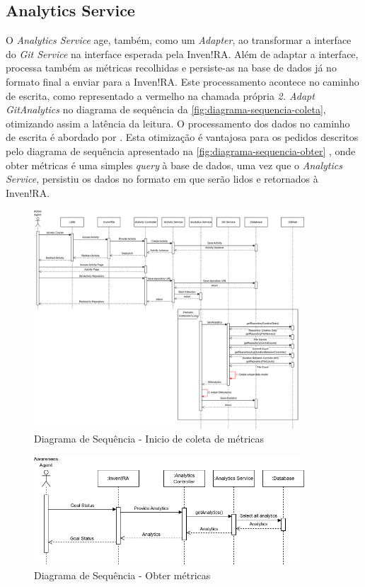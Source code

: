 \documentclass[12pt,a4paper,final]{article}
\begin{document}
    \subsection{Analytics Service}\label{subsec:analytic-sservice}
    O \textit{Analytics Service} age, também, como um \textit{Adapter}, ao transformar a interface do \textit{Git Service} na interface esperada pela Inven!RA.
    Além de adaptar a interface, processa também as métricas recolhidas e persiste-as na base de dados já no formato final a enviar para a Inven!RA. Este processamento acontece no caminho de escrita, como representado a vermelho na chamada própria \textit{2. Adapt GitAnalytics} no diagrama de sequência da \autoref{fig:diagrama-sequencia-coleta}, otimizando assim a latência da leitura.
    O processamento dos dados no caminho de escrita é abordado por \cite[Chapter 12, Observing Derived State]{kleppmann_2017_designing}.
    Esta otimização é vantajosa para os pedidos descritos pelo diagrama de sequência apresentado na \autoref{fig:diagrama-sequencia-obter} , onde obter métricas é uma simples \textit{query} à base de dados, uma vez que o \textit{Analytics Service}, persistiu os dados no formato em que serão lidos e retornados à Inven!RA.
    \begin{figure}[H]
        \centering
        \includegraphics[width=0.9\textwidth]{diagramas_sequencia-uc1.drawio}
        \caption{Diagrama de Sequência - Inicio de coleta de métricas}
        \label{fig:diagrama-sequencia-coleta}
    \end{figure}

    \begin{figure}[H]
        \centering
        \includegraphics[width=0.9\textwidth]{diagramas_sequencia-uc2.drawio}
        \caption{Diagrama de Sequência - Obter métricas}
        \label{fig:diagrama-sequencia-obter}
    \end{figure}
    \newpage
    \printbibliography
\end{document}
